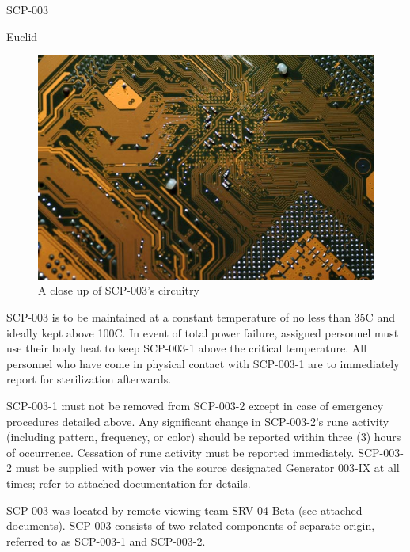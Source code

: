  SCP-003

 Euclid

\begin{figure}[h]
\begin{center}
\includegraphics[scale=0.4]{scp/003.jpg}
\linebreak A close up of SCP-003's circuitry
\end{center}
\end{figure}

 SCP-003 is to be maintained at a constant temperature of no less than 35\degree C and ideally kept above 100\degree C. In event of total power failure, assigned personnel must use their body heat to keep SCP-003-1 above the critical temperature. All personnel who have come in physical contact with SCP-003-1 are to immediately report for sterilization afterwards.

SCP-003-1 must not be removed from SCP-003-2 except in case of emergency procedures detailed above. Any significant change in SCP-003-2's rune activity (including pattern, frequency, or color) should be reported within three (3) hours of occurrence. Cessation of rune activity must be reported immediately. SCP-003-2 must be supplied with power via the source designated Generator 003-IX at all times; refer to attached documentation for details.

 SCP-003 was located by remote viewing team SRV-04 Beta (see attached documents). SCP-003 consists of two related components of separate origin, referred to as SCP-003-1 and SCP-003-2.

